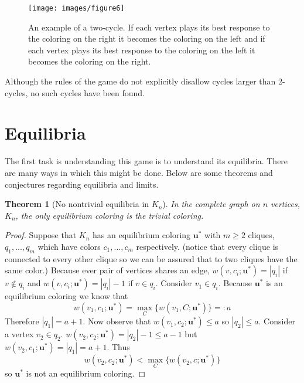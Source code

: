 \documentclass[]{article}
\newtheorem{theorem}{Theorem}
\begin{document}
\begin{figure}[h!]
	\texttt{[image: images/figure6]}
	\caption{An example of a two-cycle. If each vertex plays its best response to the coloring on the right it becomes the coloring on the left and if each vertex plays its best response to the coloring on the left it becomes the coloring on the right. }
\end{figure}

Although the rules of the game do not explicitly disallow cycles larger than 2-cycles, no such cycles have been found. 

\section{Equilibria}
The first task is understanding this game is to understand its equilibria. There are many ways in which this might be done. Below are some theorems and conjectures regarding equilibria and limits. 

\begin{theorem}[No nontrivial equilibria in $K_n$]
	In the complete graph on $n$ vertices, $K_n$, the only equilibrium coloring is the trivial coloring.
\end{theorem} 
\begin{proof} Suppose that $K_n$ has an equilibrium coloring $\mathbf{u}^*$ with $m\geq 2$ cliques, $q_1,...,q_m$ which have colors $c_1,...,c_m$ respectively. (notice that every clique is connected to every other clique so we can be assured that to two cliques have the same color.) Because ever pair of vertices shares an edge, $w(v,c_i;\mathbf{u}^*)=|q_i|$ if $v\notin q_i$ and  $w(v,c_i;\mathbf{u}^*)=|q_i|-1$ if $v\in q_i$. Consider $v_1\in q_i$. Because $\mathbf{u}^*$ is an equilibrium coloring we know that
\begin{equation}
	w(v_1,c_1;\mathbf{u}^*)=\max_C\{w(v_1,C;\mathbf{u}^*)\} =:a
\end{equation}
Therefore $|q_1|=a+1$. Now observe that $w(v_1,c_2;\mathbf{u}^*)\leq a $ so $|q_2|\leq a$. Consider a vertex $v_2\in q_2$. $w(v_2,c_2;\mathbf{u}^*)=|q_2|-1\leq a-1$ but $w(v_2,c_1;\mathbf{u}^*)=|q_1|=a+1$. Thus
\begin{equation}
	w(v_2,c_2;\mathbf{u}^*)<\max_C\{w(v_2,c;\mathbf{u}^*)\}
\end{equation}
so $\mathbf{u}^*$ is not an equilibrium coloring. 
\end{proof} 
\end{document}
